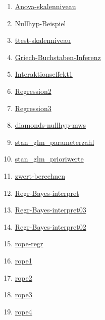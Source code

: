 \documentclass[
  a4paper,
  DIV=11]{scrreprt}
\providecommand{\tightlist}{%
  \setlength{\itemsep}{0pt}\setlength{\parskip}{0pt}}\usepackage{longtable,booktabs,array}
\theoremstyle{definition}
\theoremstyle{remark}
\begin{document}
\begin{enumerate}
\def\labelenumi{\arabic{enumi}.}
\tightlist
\item
  \href{https://datenwerk.netlify.app/posts/anova-skalenniveau/anova-skalenniveau.html}{Anova-skalenniveau}
\item
  \href{https://datenwerk.netlify.app/posts/nullhyp-beispiel/nullhyp-beispiel}{Nullhyp-Beispiel}
\item
  \href{https://datenwerk.netlify.app/posts/ttest-skalenniveau/ttest-skalenniveau.html}{ttest-skalenniveau}
\item
  \href{https://datenwerk.netlify.app/posts/griech-buchstaben-inferenz/griech-buchstaben-inferenz}{Griech-Buchstaben-Inferenz}
\item
  \href{https://datenwerk.netlify.app/posts/interaktionseffekt1/interaktionseffekt1}{Interaktionseffekt1}
\item
  \href{https://datenwerk.netlify.app/posts/regression2/regression2}{Regression2}
\item
  \href{https://datenwerk.netlify.app/posts/regression3/regression3}{Regression3}
\item
  \href{https://datenwerk.netlify.app/posts/diamonds-nullhyp-mws/diamonds-nullhyp-mws.html}{diamonds-nullhyp-mws}
\item
  \href{https://datenwerk.netlify.app/posts/stan_glm_parameterzahl/stan_glm_parameterzahl.html}{stan\_glm\_parameterzahl}
\item
  \href{https://datenwerk.netlify.app/posts/stan_glm_prioriwerte/stan_glm_prioriwerte.html}{stan\_glm\_prioriwerte}
\item
  \href{https://datenwerk.netlify.app/posts/zwert-berechnen/zwert-berechnen.html}{zwert-berechnen}
\item
  \href{https://datenwerk.netlify.app/posts/regr-bayes-interpret/regr-bayes-interpret}{Regr-Bayes-interpret}
\item
  \href{https://datenwerk.netlify.app/posts/regr-bayes-interpret03/regr-bayes-interpret03}{Regr-Bayes-interpret03}
\item
  \href{https://datenwerk.netlify.app/posts/regr-bayes-interpret03/regr-bayes-interpret02}{Regr-Bayes-interpret02}
\item
  \href{https://datenwerk.netlify.app/posts/rope-regr/rope-regr.html}{rope-regr}
\item
  \href{https://datenwerk.netlify.app/posts/rope1/rope1.html}{rope1}
\item
  \href{https://datenwerk.netlify.app/posts/rope2/rope2.html}{rope2}
\item
  \href{https://datenwerk.netlify.app/posts/rope3/rope3.html}{rope3}
\item
  \href{https://datenwerk.netlify.app/posts/rope4/rope4.html}{rope4}
\end{enumerate}
\end{document}

